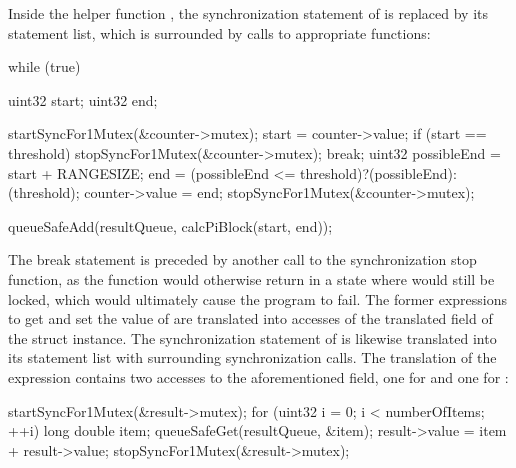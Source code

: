 Inside the helper function , the synchronization statement of  is replaced by its statement list, which is surrounded by calls to appropriate functions:
\begin{ccode}
while (true) {
  uint32 start; 
  uint32 end;
  
  startSyncFor1Mutex(&counter->mutex); 
  { 
    start = counter->value; 
    if (start == threshold) { 
      stopSyncFor1Mutex(&counter->mutex); 
      break; 
    }
    uint32 possibleEnd = start + RANGESIZE; 
    end = (possibleEnd <= threshold)?(possibleEnd):(threshold); 
    counter->value = end; 
  } 
  stopSyncFor1Mutex(&counter->mutex);
  
  queueSafeAdd(resultQueue, calcPiBlock(start, end));
}
\end{ccode}
The break statement is preceded by another call to the synchronization stop function, as the function would otherwise return in a state where  would still be locked, which would ultimately cause the program to fail. The former expressions to get and set the value of  are translated into accesses of the translated  field of the  struct instance. The synchronization statement of  is likewise translated into its statement list with surrounding synchronization calls. The translation of the expression  contains two accesses to the aforementioned  field, one for  and one for :
\begin{ccode}
startSyncFor1Mutex(&result->mutex); 
{ 
  for (uint32 i = 0; i < numberOfItems; ++i) { 
    long double item; 
    queueSafeGet(resultQueue, &item); 
    result->value = item + result->value; 
  }
} 
stopSyncFor1Mutex(&result->mutex);
\end{ccode}
